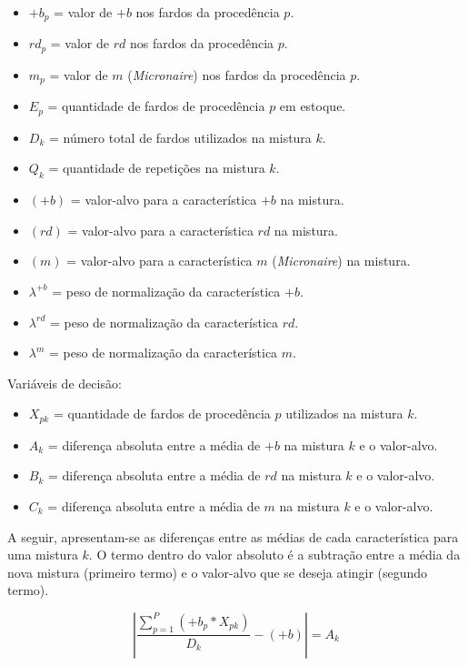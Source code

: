 \documentclass[
    12pt,                %
    openright,           %
    oneside,             %
    a4paper,             %
    english,             %
    spanish,             %
    brazil               %
]{ufscar}
\begin{document}
\begin{itemize}
    \item $+b_p$ = valor de $+b$ nos fardos da procedência $p$.
    \item $rd_p$ = valor de $rd$ nos fardos da procedência $p$.
    \item $m_p$ = valor de $m$ (\textit{Micronaire}) nos fardos da procedência $p$.
    \item $E_p$ = quantidade de fardos de procedência $p$ em estoque.
    \item $D_k$ = número total de fardos utilizados na mistura $k$.
    \item $Q_k$ = quantidade de repetições na mistura $k$.
    \item $(+b)$ = valor-alvo para a característica $+b$ na mistura.
    \item $(rd)$ = valor-alvo para a característica $rd$ na mistura.
    \item $(m)$ = valor-alvo para a característica $m$ (\textit{Micronaire}) na mistura.
    \item $\lambda^{+b}$ = peso de normalização da característica $+b$.
    \item $\lambda^{rd}$ = peso de normalização da característica $rd$.
    \item $\lambda^{m}$ = peso de normalização da característica $m$.
\end{itemize}

Variáveis de decisão:
\begin{itemize}
    \item $X_{pk}$ = quantidade de fardos de procedência $p$ utilizados na mistura $k$.
    \item $A_k$ = diferença absoluta entre a média de $+b$ na mistura $k$ e o valor-alvo.
    \item $B_k$ = diferença absoluta entre a média de $rd$ na mistura $k$ e o valor-alvo.
    \item $C_k$ = diferença absoluta entre a média de $m$ na mistura $k$ e o valor-alvo.
\end{itemize}

A seguir, apresentam-se as diferenças entre as médias de cada característica para uma mistura $k$. O termo dentro do valor absoluto é a subtração entre a média da nova mistura (primeiro termo) e o valor-alvo que se deseja atingir (segundo termo). 

\begin{equation}
\left| \frac{\sum_{p=1}^{P} (+b_p * X_{pk})}{D_k} - (+b) \right| = A_k 
\end{equation}
\end{document}
